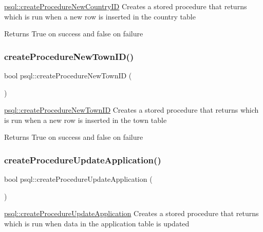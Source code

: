 \mbox{\hyperlink{classpsql_a565bfc828ecb6b5621354128773494fd}{psql\+::create\+Procedure\+New\+Country\+ID}} Creates a stored procedure that returns which is run when a new row is inserted in the country table 

\begin{DoxyReturn}{Returns}
True on success and false on failure 
\end{DoxyReturn}
\mbox{\label{classpsql_ade0c7fa4f019c3f349230af09b1de49e}} 
\subsubsection{\texorpdfstring{create\+Procedure\+New\+Town\+I\+D()}{createProcedureNewTownID()}}
{\footnotesize\ttfamily bool psql\+::create\+Procedure\+New\+Town\+ID (\begin{DoxyParamCaption}{ }\end{DoxyParamCaption})}



\mbox{\hyperlink{classpsql_ade0c7fa4f019c3f349230af09b1de49e}{psql\+::create\+Procedure\+New\+Town\+ID}} Creates a stored procedure that returns which is run when a new row is inserted in the town table 

\begin{DoxyReturn}{Returns}
True on success and false on failure 
\end{DoxyReturn}
\mbox{\label{classpsql_a28f3e3d6309e3ce57493db284c099946}} 
\subsubsection{\texorpdfstring{create\+Procedure\+Update\+Application()}{createProcedureUpdateApplication()}}
{\footnotesize\ttfamily bool psql\+::create\+Procedure\+Update\+Application (\begin{DoxyParamCaption}{ }\end{DoxyParamCaption})}



\mbox{\hyperlink{classpsql_a28f3e3d6309e3ce57493db284c099946}{psql\+::create\+Procedure\+Update\+Application}} Creates a stored procedure that returns which is run when data in the application table is updated 

